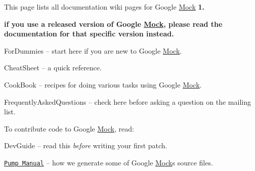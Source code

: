 This page lists all documentation wiki pages for Google \hyperlink{class_mock}{Mock} {\bfseries 1.}
\begin{DoxyItemize}
\item {\bfseries if you use a released version of Google \hyperlink{class_mock}{Mock}, please read the documentation for that specific version instead.}
\begin{DoxyItemize}
\item For\+Dummies -- start here if you are new to Google \hyperlink{class_mock}{Mock}.
\item Cheat\+Sheet -- a quick reference.
\item Cook\+Book -- recipes for doing various tasks using Google \hyperlink{class_mock}{Mock}.
\item Frequently\+Asked\+Questions -- check here before asking a question on the mailing list.
\end{DoxyItemize}
\end{DoxyItemize}

To contribute code to Google \hyperlink{class_mock}{Mock}, read\+:


\begin{DoxyItemize}
\item Dev\+Guide -- read this {\itshape before} writing your first patch.
\item \href{http://code.google.com/p/googletest/wiki/V1_6_PumpManual}{\tt Pump Manual} -- how we generate some of Google \hyperlink{class_mock}{Mock}\textquotesingle{}s source files. 
\end{DoxyItemize}